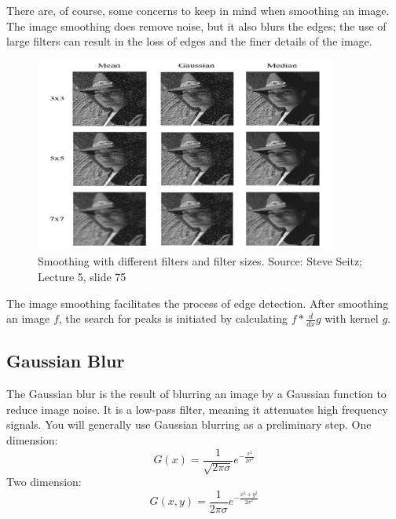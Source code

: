 \documentclass{article}
\begin{document}
There are, of course, some concerns to keep in mind when smoothing an image. The image smoothing does remove noise, but it also blurs the edges; the use of large filters can result in the loss of edges and the finer details of the image.

\begin{figure}[H]
\centering
\includegraphics[width=10cm]{seitz_smoothing.png}
\caption{Smoothing with different filters and filter sizes. Source: Steve Seitz; Lecture 5, slide 75}
\end{figure}


The image smoothing facilitates the process of edge detection. After smoothing an image $f$, the search for peaks is initiated by calculating $f * \frac{d}{dx}g$ with kernel $g$.

\subsection{Gaussian Blur}

The Gaussian blur is the result of blurring an image by a Gaussian function to reduce image noise. It is a low-pass filter, meaning it attenuates high frequency signals. You will generally use Gaussian blurring as a preliminary step.
\newline
One dimension:
$$G(x) = \frac{1}{\sqrt{2\pi\sigma}}e^{-\frac{x^2}{2\sigma^2}}$$
Two dimension:
$$G(x,y) = \frac{1}{2\pi\sigma}e^{-\frac{x^2+y^2}{2\sigma^2}}$$
\end{document}
